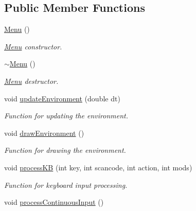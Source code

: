 \subsection*{Public Member Functions}
\begin{DoxyCompactItemize}
\item 
\hyperlink{class_menu_ad466dd83355124a6ed958430450bfe94}{Menu} ()\hypertarget{class_menu_ad466dd83355124a6ed958430450bfe94}{}\label{class_menu_ad466dd83355124a6ed958430450bfe94}

\begin{DoxyCompactList}\small\item\em \hyperlink{class_menu}{Menu} constructor. \end{DoxyCompactList}\item 
\hyperlink{class_menu_a831387f51358cfb88cd018e1777bc980}{$\sim$\+Menu} ()\hypertarget{class_menu_a831387f51358cfb88cd018e1777bc980}{}\label{class_menu_a831387f51358cfb88cd018e1777bc980}

\begin{DoxyCompactList}\small\item\em \hyperlink{class_menu}{Menu} destructor. \end{DoxyCompactList}\item 
void \hyperlink{class_menu_a1efe72e89e793c1c6f67d16c513499e1}{update\+Environment} (double dt)
\begin{DoxyCompactList}\small\item\em Function for updating the environment. \end{DoxyCompactList}\item 
void \hyperlink{class_menu_ac1403e071d911bf4c3b43d344d46ee4f}{draw\+Environment} ()\hypertarget{class_menu_ac1403e071d911bf4c3b43d344d46ee4f}{}\label{class_menu_ac1403e071d911bf4c3b43d344d46ee4f}

\begin{DoxyCompactList}\small\item\em Function for drawing the environment. \end{DoxyCompactList}\item 
void \hyperlink{class_menu_a936bec79e70b42707578af8f7d7bc1b2}{process\+KB} (int key, int scancode, int action, int mods)
\begin{DoxyCompactList}\small\item\em Function for keyboard input processing. \end{DoxyCompactList}\item 
void \hyperlink{class_menu_a2ff354c6e9693f559f3778d78a34e405}{process\+Continuous\+Input} ()\hypertarget{class_menu_a2ff354c6e9693f559f3778d78a34e405}{}\label{class_menu_a2ff354c6e9693f559f3778d78a34e405}


\end{DoxyCompactItemize}
